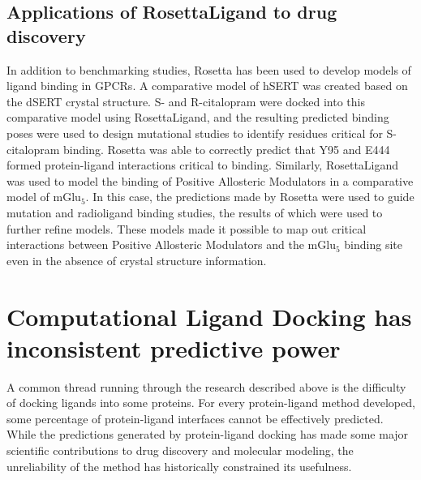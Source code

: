 \subsection{Applications of RosettaLigand to drug discovery}
In addition to benchmarking studies, Rosetta has been used to develop models of ligand binding in GPCRs.
A comparative model of hSERT was created based on the dSERT crystal structure. 
S- and R-citalopram were docked into this comparative model using RosettaLigand, and the resulting predicted binding poses were used to design mutational studies to identify residues critical for S-citalopram binding.
Rosetta was able to correctly predict that Y95 and E444 formed protein-ligand interactions critical to binding\citep{Combs:2011db}.  
Similarly, RosettaLigand was used to model the binding of Positive Allosteric Modulators in a comparative model of mGlu$_{5}$\citep{Turlington:2013et}.
In this case, the predictions made by Rosetta were used to guide mutation and radioligand binding studies, the results of which were used to further refine models.
These models made it possible to map out critical interactions between Positive Allosteric Modulators and the mGlu$_{5}$ binding site even in the absence of crystal structure information.

\section{Computational Ligand Docking has inconsistent predictive power} 

A common thread running through the research described above is the difficulty of docking ligands into some proteins.
For every protein-ligand method developed, some percentage of protein-ligand interfaces cannot be effectively predicted.
While the predictions generated by protein-ligand docking has made some major scientific contributions to drug discovery and molecular modeling, the unreliability of the method has historically constrained its usefulness.

